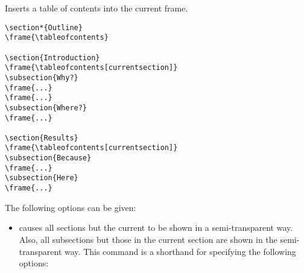 \begin{command}{\tableofcontents{}}
  Inserts a table of contents into the current frame.

  \example
\begin{verbatim}
\section*{Outline}
\frame{\tableofcontents}

\section{Introduction}
\frame{\tableofcontents[currentsection]}
\subsection{Why?}
\frame{...}
\frame{...}
\subsection{Where?}
\frame{...}

\section{Results}
\frame{\tableofcontents[currentsection]}
\subsection{Because}
\frame{...}
\subsection{Here}
\frame{...}
\end{verbatim}

  The following options can be given:
  \begin{itemize}
  \item
     causes all sections but the current to be shown in a semi-transparent way. Also, all subsections but those in the current section are shown in the semi-transparent way. This command is a shorthand for specifying the following options:


\end{itemize}
\end{command}

